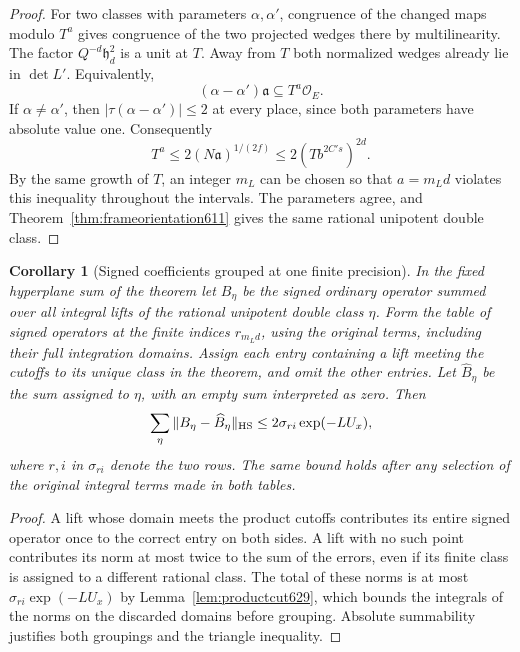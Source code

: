 \documentclass[a4paper,11pt]{article}
\newtheorem{corollary}[proposition]{Corollary}
\theoremstyle{definition}
\theoremstyle{remark}
\numberwithin{equation}{section}
\begin{document}
\begin{proof}
For two classes with parameters \(\alpha,\alpha'\), congruence
of the changed maps modulo \(T^a\) gives congruence of the two
projected wedges there by multilinearity. The factor
\(Q^{-d}\mathfrak h_d^2\) is a unit at \(T\).
Away from \(T\) both normalized wedges already lie in
\(\det L'\). Equivalently,
\[
             (\alpha-\alpha')\mathfrak a\subseteq T^a\mathcal O_E .
\]
If \(\alpha\ne\alpha'\), then
\(|\tau(\alpha-\alpha')|\le2\) at every place, since both
parameters have absolute value one. Consequently
\[
                  T^a\le 2(N\mathfrak a)^{1/(2f)}
                              \le 2(Tb^{2C's})^{2d}.
\]
By the same growth of \(T\), an integer \(m_L\) can be chosen
so that \(a=m_Ld\) violates this inequality throughout the
intervals. The parameters agree, and
Theorem~\ref{thm:frameorientation611} gives the same rational
unipotent double class.
\end{proof}

\begin{corollary}[Signed coefficients grouped at one finite precision]
\leavevmode\label{cor:terminalamplitudes640}
In the fixed hyperplane sum of the theorem let \(B_\eta\) be
the signed ordinary operator summed over all integral lifts of
the rational unipotent double class \(\eta\). Form the table of
signed operators at the finite indices \(r_{m_Ld}\), using the
original terms, including their full integration domains. Assign
each entry containing a lift meeting the cutoffs to its unique
class in the theorem, and omit the other entries. Let
\(\widehat B_\eta\) be the sum assigned to \(\eta\), with an
empty sum interpreted as zero. Then
\[
             \sum_\eta\|B_\eta-\widehat B_\eta\|_{\rm HS}
                           \le 2\sigma_{ri}\exp(-LU_x),
\]
where \(r,i\) in \(\sigma_{ri}\) denote the two rows. The same
bound holds after any selection of the original integral
terms made in both tables.
\end{corollary}
\begin{proof}
A lift whose domain meets the product cutoffs contributes its
entire signed operator once to the correct entry on both sides.
A lift with no such point contributes its norm at most twice
to the sum of the errors, even if its finite class is assigned
to a different rational class. The total of these norms is at
most \(\sigma_{ri}\exp(-LU_x)\) by
Lemma~\ref{lem:productcut629}, which bounds the integrals of
the norms on the discarded domains before grouping. Absolute
summability justifies both groupings and the triangle inequality.
\end{proof}
\end{document}

